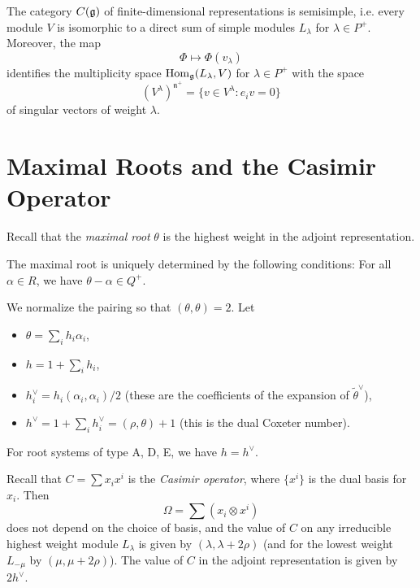 \begin{prop}
  The category $C(\mathfrak{g})$ of finite-dimensional
  representations is semisimple, i.e.
  every module $V$ is isomorphic to a
  direct sum of simple modules
  $L_\lambda$ for $\lambda \in P^+$.
  Moreover, the map
  \[
    \Phi \longmapsto \Phi(v_\lambda)
  \]
  identifies the multiplicity space
  $\operatorname{Hom}_{\mathfrak{g}}(L_\lambda, V)$ for $\lambda \in P^+$
  with the space
  \[
    (V^\lambda)^{\mathfrak{n}^+}
    = \{v \in V^\lambda : e_i v = 0\}
  \]
  of singular vectors of weight $\lambda$.
\end{prop}

\section{Maximal Roots and the Casimir Operator}

\begin{remark}
  Recall that the \emph{maximal root} $\theta$
  is the highest weight in the
  adjoint representation.
\end{remark}

\begin{prop}
  The maximal root is uniquely determined
  by the following conditions:
  For all $\alpha \in R$, we have
  $\theta - \alpha \in Q^+$.
\end{prop}

\begin{remark}
  We normalize the pairing so that
  $(\theta, \theta) = 2$. Let
  \begin{itemize}
    \item $\theta = \sum_i h_i \alpha_i$,
    \item $h = 1 + \sum_i h_i$,
    \item $h_i^\vee = h_i (\alpha_i, \alpha_i) / 2$ (these are the coefficients of the
      expansion of ${\widetilde{\theta}}^\vee$),
    \item $h^\vee = 1 + \sum_i h_i^\vee = (\rho, \theta) + 1$
      (this is the dual Coxeter number).
  \end{itemize}
  For root systems of type A, D, E, we have
  $h = h^\vee$.
\end{remark}

\begin{remark}
  Recall that $C = \sum x_i x^i$ is the
  \emph{Casimir operator}, where
  $\{x^i\}$ is the dual basis for $x_i$.
  Then
  \[
    \Omega = \sum (x_i \otimes x^i)
  \]
  does not depend on the choice of basis,
  and the value of $C$ on any irreducible
  highest weight module $L_\lambda$ is given by
  $(\lambda, \lambda + 2\rho)$ (and
  for the lowest weight $L_{-\mu}$ by
  $(\mu, \mu + 2\rho)$).
  The value of $C$ in the adjoint representation
  is given by $2h^\vee$.
\end{remark}

